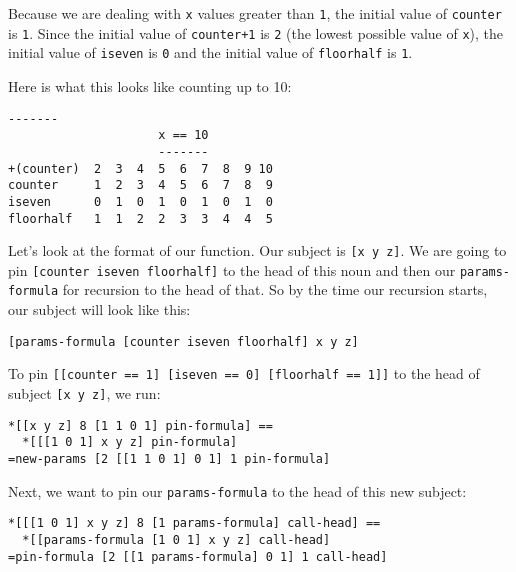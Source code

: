\documentclass[twoside]{article}
\begin{document}
Because we are dealing with \lstinline[style=inlinecode]{x} values greater than \lstinline[style=inlinecode]{1}, the initial value of \lstinline[style=inlinecode]{counter} is \lstinline[style=inlinecode]{1}. Since the initial value of \lstinline[style=inlinecode]{counter+1} is \lstinline[style=inlinecode]{2} (the lowest possible value of \lstinline[style=inlinecode]{x}), the initial value of \lstinline[style=inlinecode]{iseven} is \lstinline[style=inlinecode]{0} and the initial value of \lstinline[style=inlinecode]{floorhalf} is \lstinline[style=inlinecode]{1}.

Here is what this looks like counting up to 10:

\begin{lstlisting}[style=listingblock]
                     -------
                     x == 10
                     -------
+(counter)  2  3  4  5  6  7  8  9 10
counter     1  2  3  4  5  6  7  8  9
iseven      0  1  0  1  0  1  0  1  0
floorhalf   1  1  2  2  3  3  4  4  5
\end{lstlisting}

\noindent
Let's look at the format of our function. Our subject is \lstinline[style=inlinecode]{[x y z]}. We are going to pin \lstinline[style=inlinecode]{[counter iseven floorhalf]} to the head of this noun and then our \lstinline[style=inlinecode]{params-formula} for recursion to the head of that. So by the time our recursion starts, our subject will look like this:

\begin{lstlisting}[style=listingblock]
[params-formula [counter iseven floorhalf] x y z]
\end{lstlisting}

\noindent
To pin \lstinline[style=inlinecode]{[[counter == 1] [iseven == 0] [floorhalf == 1]]} to the head of subject \lstinline[style=inlinecode]{[x y z]}, we run:

\begin{lstlisting}[style=listingblock]
*[[x y z] 8 [1 1 0 1] pin-formula] ==
  *[[[1 0 1] x y z] pin-formula]
=new-params [2 [[1 1 0 1] 0 1] 1 pin-formula]
\end{lstlisting}

\noindent
Next, we want to pin our \lstinline[style=inlinecode]{params-formula} to the head of this new subject:

\begin{lstlisting}[style=listingblock]
*[[[1 0 1] x y z] 8 [1 params-formula] call-head] ==
  *[[params-formula [1 0 1] x y z] call-head]
=pin-formula [2 [[1 params-formula] 0 1] 1 call-head]
\end{lstlisting}
\end{document}
